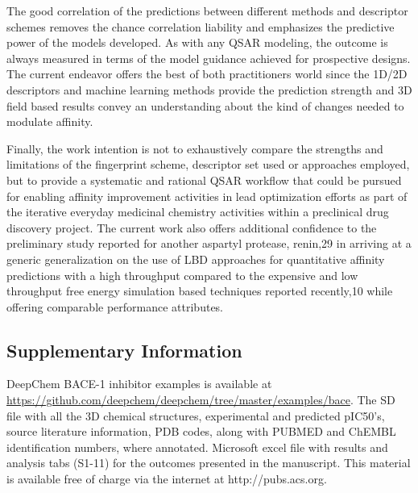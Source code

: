 The good correlation of the predictions between different methods and descriptor schemes removes the chance correlation liability and emphasizes the predictive power of the models developed.  As with any QSAR modeling, the outcome is always measured in terms of the model guidance achieved for prospective designs.  The current endeavor offers the best of both practitioners world since the 1D/2D descriptors and machine learning methods provide the prediction strength and 3D field based results convey an understanding about the kind of changes needed to modulate affinity.  

Finally, the work intention is not to exhaustively compare the strengths and limitations of the fingerprint scheme, descriptor set used or approaches employed, but to provide a systematic and rational QSAR workflow that could be pursued for enabling affinity improvement activities in lead optimization efforts as part of the iterative everyday medicinal chemistry activities within a preclinical drug discovery project.  The current work also offers additional confidence to the preliminary study reported for another aspartyl protease, renin,29 in arriving at a generic generalization on the use of LBD approaches for quantitative affinity predictions with a high throughput compared to the expensive and low throughput free energy simulation based techniques reported recently,10 while offering comparable performance attributes. 

\subsection{Supplementary Information}

DeepChem BACE-1 inhibitor examples is available at \url{https://github.com/deepchem/deepchem/tree/master/examples/bace}. 
The SD file with all the 3D chemical structures, experimental and predicted pIC50’s, source literature information, PDB codes, along with PUBMED and ChEMBL identification numbers, where annotated. Microsoft excel file with results and analysis tabs (S1-11) for the outcomes presented in the manuscript.  This material is available free of charge via the internet at http://pubs.acs.org.

